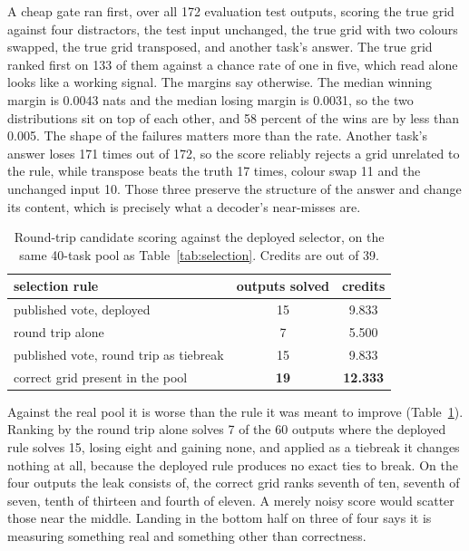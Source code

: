 \documentclass[11pt]{article}
\begin{document}
A cheap gate ran first, over all 172 evaluation test outputs, scoring the true grid against four
distractors, the test input unchanged, the true grid with two colours swapped, the true grid transposed,
and another task's answer. The true grid ranked first on 133 of them against a chance rate of one in five,
which read alone looks like a working signal. The margins say otherwise. The median winning margin is
0.0043 nats and the median losing margin is 0.0031, so the two distributions sit on top of each other, and
58 percent of the wins are by less than 0.005. The shape of the failures matters more than the rate.
Another task's answer loses 171 times out of 172, so the score reliably rejects a grid unrelated to the
rule, while transpose beats the truth 17 times, colour swap 11 and the unchanged input 10. Those three
preserve the structure of the answer and change its content, which is precisely what a decoder's
near-misses are.

\begin{table}[H]
\centering
\caption{Round-trip candidate scoring against the deployed selector, on the same 40-task pool as
Table~\ref{tab:selection}. Credits are out of 39.}
\label{tab:roundtrip}
\begin{tabular}{lcc}
\toprule
selection rule & outputs solved & credits \\
\midrule
published vote, deployed                & 15 & 9.833 \\
round trip alone                        & \phantom{0}7 & 5.500 \\
published vote, round trip as tiebreak  & 15 & 9.833 \\
\midrule
correct grid present in the pool        & \textbf{19} & \textbf{12.333} \\
\bottomrule
\end{tabular}
\end{table}

Against the real pool it is worse than the rule it was meant to improve (Table~\ref{tab:roundtrip}).
Ranking by the round trip alone solves 7 of the 60 outputs where the deployed rule solves 15, losing eight
and gaining none, and applied as a tiebreak it changes nothing at all, because the deployed rule produces
no exact ties to break. On the four outputs the leak consists of, the correct grid ranks seventh of ten,
seventh of seven, tenth of thirteen and fourth of eleven. A merely noisy score would scatter those near the
middle. Landing in the bottom half on three of four says it is measuring something real and something other
than correctness.
\end{document}
